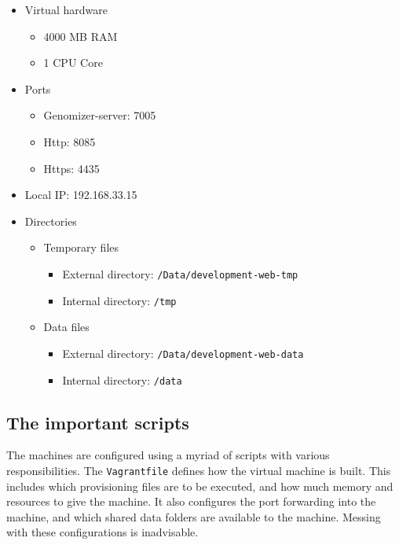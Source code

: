 \begin{itemize}
\itemsep1pt\parskip0pt
\item
  Virtual hardware

  \begin{itemize}
  \itemsep1pt\parskip0pt
  \item
    4000 MB RAM
  \item
    1 CPU Core
  \end{itemize}
\item
  Ports

  \begin{itemize}
  \itemsep1pt\parskip0pt
  \item
    Genomizer-server: 7005
  \item
    Http: 8085
  \item
    Https: 4435
  \end{itemize}
\item
  Local IP: 192.168.33.15
\item
  Directories

  \begin{itemize}
  \itemsep1pt\parskip0pt
  \item
    Temporary files

    \begin{itemize}
    \itemsep1pt\parskip0pt
    \item
      External directory: \texttt{/Data/development-web-tmp}
    \item
      Internal directory: \texttt{/tmp}
    \end{itemize}
  \item
    Data files

    \begin{itemize}
    \itemsep1pt\parskip0pt
    \item
      External directory: \texttt{/Data/development-web-data}
    \item
      Internal directory: \texttt{/data}
    \end{itemize}
  \end{itemize}
\end{itemize}

\subsection{The important scripts}\label{the-important-scripts}

The machines are configured using a myriad of scripts with various
responsibilities. The \texttt{Vagrantfile} defines how the virtual
machine is built. This includes which provisioning files are to be
executed, and how much memory and resources to give the machine. It also
configures the port forwarding into the machine, and which shared data
folders are available to the machine. Messing with these configurations
is inadvisable.

